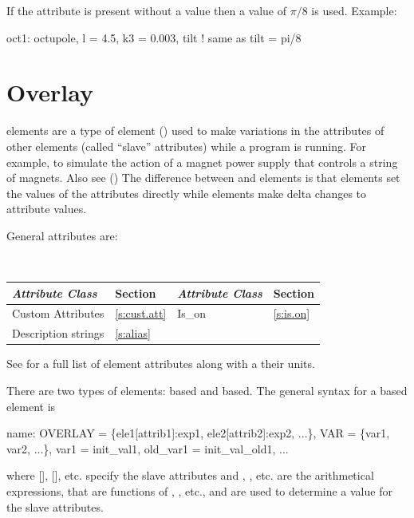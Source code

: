 {
If the  attribute is present without a value then a value of 
$\pi/8$ is used.
Example:
\begin{example}
  oct1: octupole, l = 4.5, k3 = 0.003, tilt ! same as tilt = pi/8
\end{example}

\newpage

\section{Overlay}
\label{s:overlay}

 elements are a type of  element () used to make
variations in the attributes of other elements (called ``slave'' attributes) while a program is
running. For example, to simulate the action of a magnet power supply that controls a string of
magnets. Also see  () The difference between  and 
elements is that  elements set the values of the attributes directly while 
elements make delta changes to attribute values.

General  attributes are:
\begin{center}
\tt
\begin{tabular}{llll} \toprule
  {\sl Attribute Class}      & Section           & {\sl Attribute Class}      & Section         \\ \midrule
  Custom Attributes          & \ref{s:cust.att}  & Is_on                      & \ref{s:is.on}   \\
  Description strings        & \ref{s:alias}     &                            &                 \\ 
  \bottomrule
\end{tabular}
\end{center}
\toffset
See  for a full list of element attributes along with a their units.

There are two types of  elements:  based and  based.
The general syntax for a  based  element is
\begin{example}
  name: OVERLAY = \{ele1[attrib1]:exp1, ele2[attrib2]:exp2, ...\}, 
              VAR = \{var1, var2, ...\}, var1 = init_val1, old_var1 = init_val_old1, ...
\end{example}
where [], [], etc. specify the slave attributes and
, , etc. are the arithmetical expressions, that are functions of ,
, etc., and are used to determine a value for the slave attributes.

}
